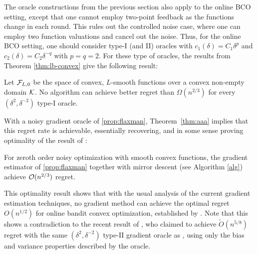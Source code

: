 The oracle constructions from the previous section also apply to the online BCO setting, except that one cannot employ two-point feedback as the functions change in each round.  
This rules out the controlled noise case, where one can employ two function valuations and cancel out the noise. Thus, for the online BCO setting, one should consider type-I (and II) oracles with $c_1(\delta) = C_1 \delta^p$ and $c_2(\delta) = C_2\delta^{-q}$ with $p=q=2$.
For these type of oracles, the results from Theorem \ref{thm:lb-convex} give the following result: 
\begin{theorem}\label{thm:aaa}
Let $\mathcal{F}_{L,0}$ be the space of convex, $L$-smooth functions over a convex non-empty domain $\mathcal{K}$.
No algorithm can achieve better regret than $\Omega(n^{2/3})$ for every $(\delta^2,\delta^{-2})$ type-I oracle.
\end{theorem}
\vspace{-0.2cm}
With a noisy gradient oracle of \cref{prop:flaxman}, Theorem~\ref{thm:aaa} implies that this regret rate is achievable, essentially recovering, and in some sense proving optimality of the result of \citet{saha2011improved}:
\begin{theorem}
For zeroth order noisy optimization with smooth convex functions, the gradient estimator of \cref{prop:flaxman} together with mirror descent (see Algorithm \ref{alg}) achieve $\mathcal{O}(n^{2/3})$ regret.
\end{theorem}
\vspace{-0.2cm}
This optimality result shows that with the usual analysis of the current gradient estimation techniques, no gradient method can achieve the optimal regret $O(n^{1/2})$ for online bandit convex optimization, established by \citet{BubeckDKP15,BuEl15}. Note that this shows a contradiction to the recent result of \citet{DeElKo15}, who claimed to achieve $\tilde{O}(n^{5/8})$ regret with the same $(\delta^2,\delta^{-2})$ type-II gradient oracle as \citet{saha2011improved}, using only the bias and variance properties described by the oracle.





